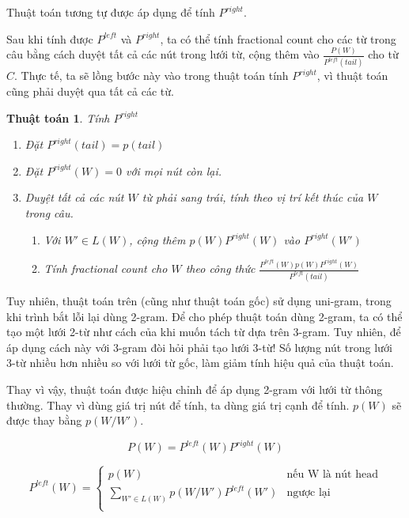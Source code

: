 \documentclass[a4paper,oneside]{book} %
\newtheorem{algo}{Thuật toán}
\begin{document}
Thuật toán tương tự được áp dụng để tính $P^{right}$.

Sau khi tính được $P^{left}$ và $P^{right}$, ta có thể tính fractional
count cho các từ trong câu bằng cách duyệt tất cả các nút trong lưới từ,
cộng thêm vào $\displaystyle\frac{P(W)}{P^{left}(tail)}$ cho từ
$C$. Thực tế, ta sẽ lồng bước này vào trong thuật toán tính
$P^{right}$, vì thuật toán cũng phải duyệt qua tất cả các từ.

\begin{algo}Tính $P^{right}$
  
\begin{enumerate}
\item Đặt $P^{right}(tail) = p(tail)$
\item Đặt $P^{right}(W) = 0$ với mọi nút còn lại.
\item Duyệt tất cả các nút $W$ từ phải sang trái, tính theo vị trí kết
  thúc của $W$ trong câu.
  \begin{enumerate}
  \item Với $W' \in L(W)$, cộng thêm $p(W)P^{right}(W)$ vào
    $P^{right}(W')$
  \item Tính fractional count cho $W$ theo công thức
    $\displaystyle\frac{P^{left}(W)p(W)P^{right}(W)}{P^{left}(tail)}$
  \end{enumerate}
\end{enumerate}
\end{algo}


Tuy nhiên, thuật toán trên (cũng như thuật toán gốc) sử dụng
uni-gram, trong khi trình bắt lỗi lại dùng 2-gram. Để cho phép thuật
toán dùng 2-gram, ta có thể tạo một lưới 2-từ như cách của
\cite{Ravishankar} khi muốn tách từ dựa trên 3-gram. Tuy nhiên, để áp
dụng cách này với 3-gram đòi hỏi phải tạo lưới 3-từ! Số lượng nút
trong lưới 3-từ nhiều hơn nhiều so với lưới từ gốc, làm giảm tính hiệu
quả của thuật toán. 

Thay vì vậy, thuật toán được hiệu chỉnh để áp dụng 2-gram với lưới từ
thông thường. Thay vì dùng giá trị nút để tính, ta dùng giá trị cạnh
để tính. $p(W)$ sẽ được thay bằng $p(W/W')$.

$$P(W)=P^{left}(W)P^{right}(W)$$

$$
P^{left}(W) = \left\{
    \begin{array}{ll}
      p(W)&\text{nếu W là nút head}\\
      \displaystyle\sum_{W' \in L(W)}p(W/W')P^{left}(W')&\text{ngược lại}\\
    \end{array}
  \right.
$$
\end{document}
